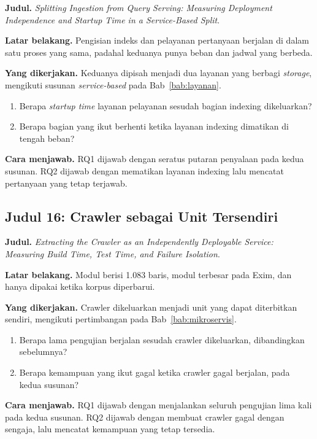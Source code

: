 \textbf{Judul.} \textit{Splitting Ingestion from Query Serving: Measuring
Deployment Independence and Startup Time in a Service-Based Split}.

\textbf{Latar belakang.} Pengisian indeks dan pelayanan pertanyaan berjalan di
dalam satu proses yang sama, padahal keduanya punya beban dan jadwal yang
berbeda.

\textbf{Yang dikerjakan.} Keduanya dipisah menjadi dua layanan yang berbagi
\textit{storage}, mengikuti susunan \textit{service-based} pada Bab~\ref{bab:layanan}.

\begin{enumerate}
  \item Berapa \textit{startup time} layanan pelayanan sesudah bagian indexing
    dikeluarkan?
  \item Berapa bagian yang ikut berhenti ketika layanan indexing dimatikan di
    tengah beban?
\end{enumerate}

\textbf{Cara menjawab.} RQ1 dijawab dengan seratus putaran penyalaan pada
kedua susunan. RQ2 dijawab dengan mematikan layanan indexing lalu mencatat
pertanyaan yang tetap terjawab.

\subsection*{Judul 16: Crawler sebagai Unit Tersendiri}

\textbf{Judul.} \textit{Extracting the Crawler as an Independently Deployable
Service: Measuring Build Time, Test Time, and Failure Isolation}.

\textbf{Latar belakang.} Modul  berisi 1.083 baris,
modul terbesar pada Exim, dan hanya dipakai ketika korpus diperbarui.

\textbf{Yang dikerjakan.} Crawler dikeluarkan menjadi unit yang dapat
diterbitkan sendiri, mengikuti pertimbangan pada Bab~\ref{bab:mikroservis}.

\begin{enumerate}
  \item Berapa lama pengujian berjalan sesudah crawler dikeluarkan,
    dibandingkan sebelumnya?
  \item Berapa kemampuan yang ikut gagal ketika crawler gagal berjalan, pada
    kedua susunan?
\end{enumerate}

\textbf{Cara menjawab.} RQ1 dijawab dengan menjalankan seluruh pengujian lima
kali pada kedua susunan. RQ2 dijawab dengan membuat crawler gagal dengan
sengaja, lalu mencatat kemampuan yang tetap tersedia.

